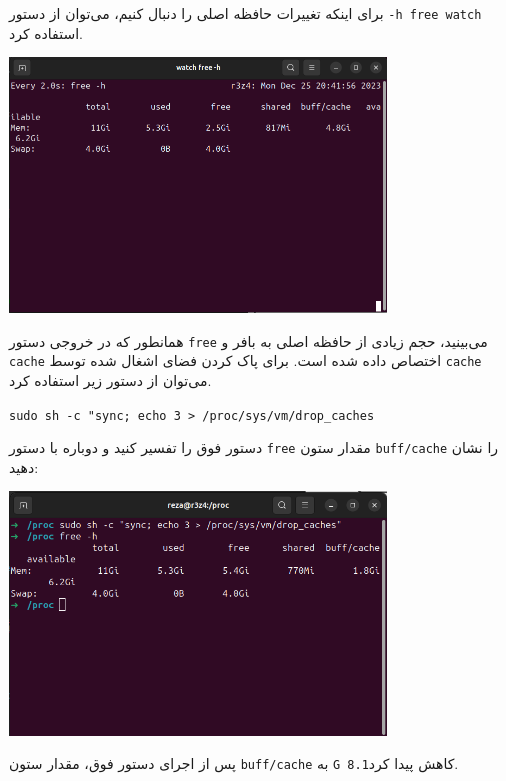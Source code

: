 \begin{qsolve}
	
	برای اینکه تغییرات حافظه اصلی را دنبال کنیم، می‌توان از دستور \texttt{-h free watch} استفاده کرد.
	\begin{center}
		\includegraphics[width=10cm]{pics/img6.png}
	\end{center}
	
	
	
	همانطور که در خروجی دستور \texttt{free} می‌بینید، حجم زیادی از حافظه اصلی به بافر و \texttt{cache} اختصاص داده شده است. برای پاک کردن فضای اشغال شده توسط \texttt{cache} می‌توان از دستور زیر استفاده کرد.
	
	\begin{latin}
		\texttt{sudo sh -c "sync; echo 3 > /proc/sys/vm/drop\_caches}
	\end{latin}
	
	دستور فوق را تفسیر کنید و دوباره با دستور \texttt{free} مقدار ستون \texttt{buff/cache} را نشان دهید:
	
	\begin{center}
		\includegraphics[width=10cm]{pics/img7.png}
	\end{center}
	
پس از اجرای دستور فوق، مقدار ستون \texttt{buff/cache} به \texttt{G 8.1}کاهش پیدا کرد.


\end{qsolve}
